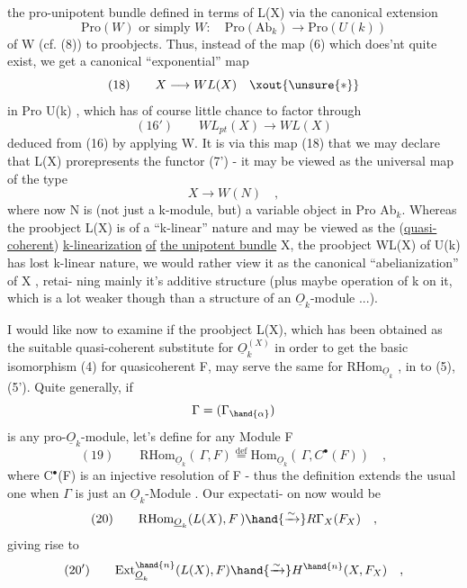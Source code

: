 
the pro-unipotent bundle defined in terms of L(X) via the canonical
extension
\[ \mathrm{Pro}(W) \text{ or simply } W : \quad \mathrm{Pro}(\mathrm{Ab}_k) \longrightarrow \mathrm{Pro}(U(k)) \]
of W  (cf. (8)) to proobjects. Thus, instead of the map (6) which
does'nt quite exist, we get a canonical ``exponential'' map
\[ (18) \qquad X \longrightarrow WL(X) \quad \xout{\unsure{*}} \]
in Pro U(k) , which has of course little chance to factor through
\[ (16') \qquad WL_{pt}(X) \longrightarrow WL(X) \]
deduced from (16) by applying W. It is via this map (18) that we may
declare that L(X) prorepresents the functor (7') - it may be viewed
as the universal map of the type
\[ X \longrightarrow W(N) \quad , \]
where now N is (not just a k-module, but) a variable object in Pro Ab$_k$.
Whereas the proobject L(X) is of a ``k-linear'' nature and may be viewed
as the (\uline{quasi-coherent}) \uline{k-linearization} \uline{of} \uline{the unipotent bundle} X,
the proobject WL(X)  of U(k) has lost  k-linear nature,
we would rather view it as the canonical ``abelianization'' of X , retai-%
ning mainly it's additive structure (plus maybe operation of k on it,
which is a lot weaker though than a structure of an $\underline{O}_k$-module ...).

I would like now to examine if the  proobject L(X), which has
been obtained as the suitable quasi-coherent substitute for $\underline{O}_k^{(X)}$
in order to get the basic isomorphism (4) for quasicoherent F, may
serve the same  for RHom$_{\underline{O}_k}$ , in  to (5),(5'). Quite
generally, if
\[ \Gamma=(\Gamma_{\hand{\alpha}}) \]
is any pro-$\underline{O}_k$-module, let's define for any Module F
\[ (19) \qquad \mathrm{RHom}_{\underline{O}_k}(\,\Gamma, F) \overset{\mathrm{def}}{=} \mathrm{Hom}_{\underline{O}_k}(\,\Gamma , C^{\bullet}(F)) \quad , \]
where C$^{\bullet}$(F) is an injective resolution of F - thus the definition
extends the usual one  when $\Gamma$ is just an $\underline{O}_k$-Module . Our expectati-%
on now would be
\[ (20) \qquad \mathrm{RHom}_{\underline{O}_k}(L(X), F\,) \hand{\xrightarrow{\sim}} R\Gamma_X(F_X) \quad , \]
giving rise to
\[ (20') \qquad \mathrm{Ext}^{\hand{n}}_{\underline{O}_k}(L(X),F) \hand{\xrightarrow{\sim}} H^{\hand{n}}(X,F_X) \quad , \]


